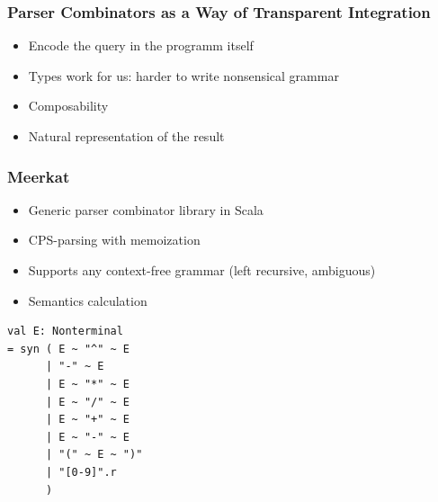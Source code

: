 \documentclass[xcolor=table]{beamer}
\begin{document}
\begin{frame}[fragile]
  \transwipe[direction=90]
  \frametitle{Parser Combinators as a Way of Transparent Integration}
\begin{itemize}
  \item Encode the query in the programm itself
  \item Types work for us: harder to write nonsensical grammar
  \item Composability 
  \item Natural representation of the result
\end{itemize}
\end{frame}

\begin{frame}[fragile]
  \transwipe[direction=90]
  \frametitle{Meerkat}
\begin{itemize}
  \item Generic parser combinator library in Scala
  \item CPS-parsing with memoization
  \item Supports any context-free grammar (left recursive, ambiguous)
  \item Semantics calculation
\end{itemize}

\begin{lstlisting}
val E: Nonterminal
= syn ( E ~ "^" ~ E
      | "-" ~ E
      | E ~ "*" ~ E 
      | E ~ "/" ~ E 
      | E ~ "+" ~ E 
      | E ~ "-" ~ E
      | "(" ~ E ~ ")"
      | "[0-9]".r 
      )
\end{lstlisting}
\end{frame}
\end{document}
